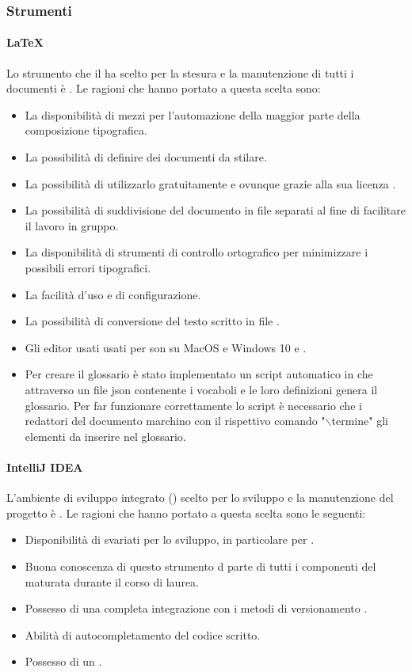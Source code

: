 \subsubsection{Strumenti}
\paragraph{LaTeX}
Lo strumento che il  ha scelto per la stesura e la manutenzione di tutti i documenti è . Le ragioni che hanno portato a questa scelta sono:
\begin{itemize}
\item La disponibilità di mezzi per l'automazione della maggior parte della composizione tipografica.
\item La possibilità di definire  dei documenti da stilare.
\item La possibilità di utilizzarlo gratuitamente e ovunque grazie alla sua licenza .
\item La possibilità di suddivisione del documento in file separati al fine di facilitare il lavoro in gruppo.
\item La disponibilità di strumenti di controllo ortografico per minimizzare i possibili errori tipografici.
\item La facilità d'uso e di configurazione.
\item La possibilità di conversione del testo scritto in file .
\item Gli editor usati usati per  son  su MacOS e Windows 10 e .
\item Per creare il glossario è stato implementato un script automatico in  che attraverso un file json contenente i vocaboli e le loro definizioni genera il glossario. Per far funzionare correttamente lo script è necessario che i redattori del documento marchino con il rispettivo comando "$\backslash$termine" gli elementi da inserire nel glossario.
\end{itemize}

\paragraph{IntelliJ IDEA}
L'ambiente di sviluppo integrato () scelto per lo sviluppo e la manutenzione del progetto è . Le ragioni che hanno portato a questa scelta sono le seguenti:
\begin{itemize}
\item Disponibilità di svariati  per lo sviluppo, in particolare per .
\item Buona conoscenza di questo strumento d parte di tutti i componenti del  maturata durante il corso di laurea.
\item Possesso di una completa integrazione con i metodi di versionamento .
\item Abilità di autocompletamento del codice  scritto.
\item Possesso di un  .
\end{itemize}

